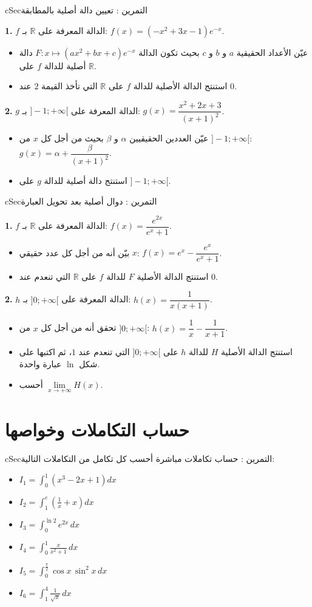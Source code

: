 \documentclass[12pt,a4paper]{article}
\newenvironment{BOX}[2]{\begin{otherlanguage}{english}\begin{arbox}{#1}{#2}}{\end{arbox}\end{otherlanguage}}
\newcounter{exo}
\newenvironment{tamrin}[1]{\stepcounter{exo}\begin{BOX}{cSec}{التمرين \theexo: #1}}{\end{BOX}}
\newcommand{\R}{\mathbb{R}}
\newenvironment{sq}{\begin{itemize}[leftmargin=2.4em,itemsep=3pt]}{\end{itemize}}
\newcommand{\qa}{\item[(أ)]}\newcommand{\qb}{\item[(ب)]}\newcommand{\qc}{\item[(جـ)]}\newcommand{\qd}{\item[(د)]}\newcommand{\qe}{\item[(هـ)]}
\newcommand{\QQ}[1]{\par\smallskip\textbf{#1.} }
\begin{document}
\begin{tamrin}{تعيين دالة أصلية بالمطابقة}
\QQ{1} $f$ الدالة المعرفة على $\R$ بـ: $f(x)=\left(-x^{2}+3x-1\right)e^{-x}$.
\begin{sq}
\qa عيّن الأعداد الحقيقية $a$ و $b$ و $c$ بحيث تكون الدالة $F:x\mapsto\left(ax^{2}+bx+c\right)e^{-x}$ دالة أصلية للدالة $f$ على $\R$.
\qb استنتج الدالة الأصلية للدالة $f$ على $\R$ التي تأخذ القيمة $2$ عند $0$.
\end{sq}
\QQ{2} $g$ الدالة المعرفة على $]-1;+\infty[$ بـ: $g(x)=\dfrac{x^{2}+2x+3}{(x+1)^{2}}$.
\begin{sq}
\qa عيّن العددين الحقيقيين $\alpha$ و $\beta$ بحيث من أجل كل $x$ من $]-1;+\infty[$: $g(x)=\alpha+\dfrac{\beta}{(x+1)^{2}}$.
\qb استنتج دالة أصلية للدالة $g$ على $]-1;+\infty[$.
\end{sq}
\end{tamrin}

\begin{tamrin}{دوال أصلية بعد تحويل العبارة}
\QQ{1} $f$ الدالة المعرفة على $\R$ بـ: $f(x)=\dfrac{e^{2x}}{e^{x}+1}$.
\begin{sq}
\qa بيّن أنه من أجل كل عدد حقيقي $x$: $f(x)=e^{x}-\dfrac{e^{x}}{e^{x}+1}$.
\qb استنتج الدالة الأصلية $F$ للدالة $f$ على $\R$ التي تنعدم عند $0$.
\end{sq}
\QQ{2} $h$ الدالة المعرفة على $]0;+\infty[$ بـ: $h(x)=\dfrac{1}{x(x+1)}$.
\begin{sq}
\qa تحقق أنه من أجل كل $x$ من $]0;+\infty[$: $h(x)=\dfrac1x-\dfrac{1}{x+1}$.
\qb استنتج الدالة الأصلية $H$ للدالة $h$ على $]0;+\infty[$ التي تنعدم عند $1$، ثم اكتبها على شكل $\ln$ عبارة واحدة.
\qc أحسب $\lim\limits_{x\to+\infty}H(x)$.
\end{sq}
\end{tamrin}

\section{حساب التكاملات وخواصها}

\begin{tamrin}{حساب تكاملات مباشرة}
أحسب كل تكامل من التكاملات التالية:
\begin{sq}
\qa $I_1=\displaystyle\int_{0}^{1}\left(x^{3}-2x+1\right)dx$
\qb $I_2=\displaystyle\int_{1}^{e}\left(\frac1x+x\right)dx$
\qc $I_3=\displaystyle\int_{0}^{\ln2}e^{2x}\,dx$
\qd $I_4=\displaystyle\int_{0}^{1}\frac{x}{x^{2}+1}\,dx$
\qe $I_5=\displaystyle\int_{0}^{\frac{\pi}{2}}\cos x\,\sin^{2}x\,dx$
\item[(و)] $I_6=\displaystyle\int_{1}^{4}\frac{1}{\sqrt{x}}\,dx$
\end{sq}
\end{tamrin}
\end{document}
